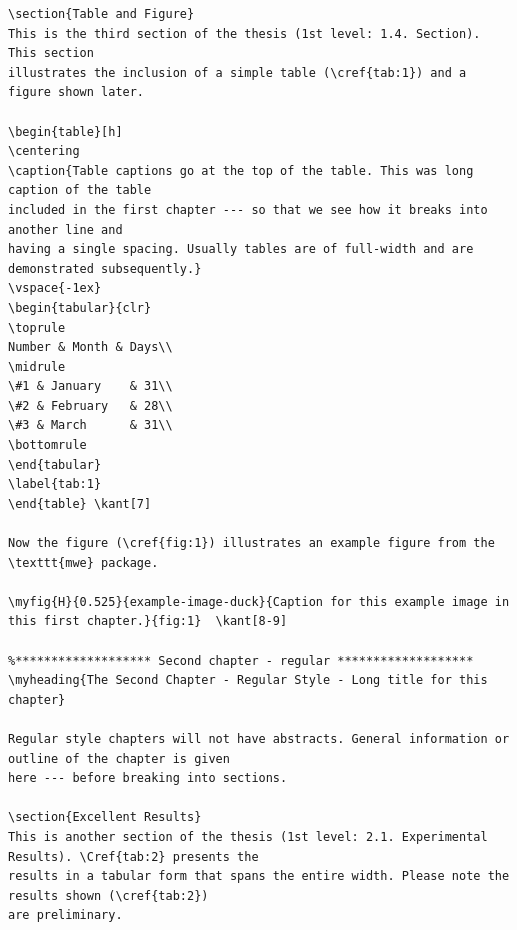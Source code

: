 \documentclass{article}
\begin{document}
{\begin{verbatim}
\section{Table and Figure}
This is the third section of the thesis (1st level: 1.4. Section). This section
illustrates the inclusion of a simple table (\cref{tab:1}) and a figure shown later.

\begin{table}[h]
\centering
\caption{Table captions go at the top of the table. This was long caption of the table
included in the first chapter --- so that we see how it breaks into another line and
having a single spacing. Usually tables are of full-width and are demonstrated subsequently.}
\vspace{-1ex}
\begin{tabular}{clr}
\toprule
Number & Month & Days\\
\midrule
\#1 & January    & 31\\
\#2 & February   & 28\\
\#3 & March      & 31\\
\bottomrule
\end{tabular}
\label{tab:1}
\end{table}	\kant[7]

Now the figure (\cref{fig:1}) illustrates an example figure from the \texttt{mwe} package.

\myfig{H}{0.525}{example-image-duck}{Caption for this example image in this first chapter.}{fig:1} 	\kant[8-9]

%******************* Second chapter - regular *******************
\myheading{The Second Chapter - Regular Style - Long title for this chapter}

Regular style chapters will not have abstracts. General information or outline of the chapter is given
here --- before breaking into sections.

\section{Excellent Results}
This is another section of the thesis (1st level: 2.1. Experimental Results). \Cref{tab:2} presents the
results in a tabular form that spans the entire width. Please note the results shown (\cref{tab:2}) 
are preliminary.


\end{verbatim}}
\end{document}
